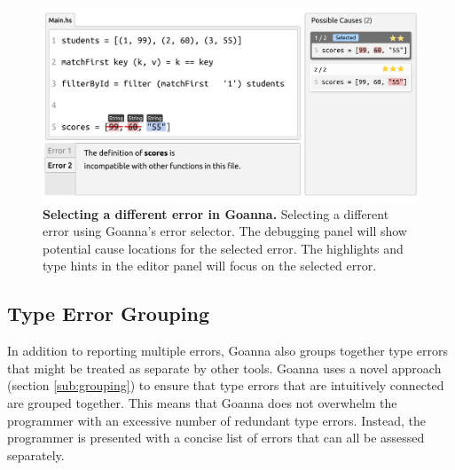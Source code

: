 \documentclass[pdflatex,lineno,sn-nature,Numbered]{sn-jnl}%
\begin{document}
    \begin{figure}[ht!]
        \centering
        \includegraphics[width=\linewidth]{images/goanna-multi-error}
        \caption[Selecting a different error in Goanna]{\textbf{Selecting a different error in Goanna.} Selecting a different error using Goanna's error selector. The debugging panel will show potential cause locations for the selected error. The highlights and type hints in the editor panel will focus on the selected error.}
        \label{fig:multi-error}
    \end{figure}



    \subsection{Type Error Grouping}  \label{sub:group}
    In addition to reporting multiple errors, Goanna also groups together type errors that might be treated as separate by other tools. Goanna uses a novel approach (section \ref{sub:grouping}) to ensure that type errors that are intuitively connected are grouped together. This means that Goanna does not overwhelm the programmer with an excessive number of redundant type errors. Instead, the programmer is presented with a concise list of errors that can all be assessed separately.
\end{document}
